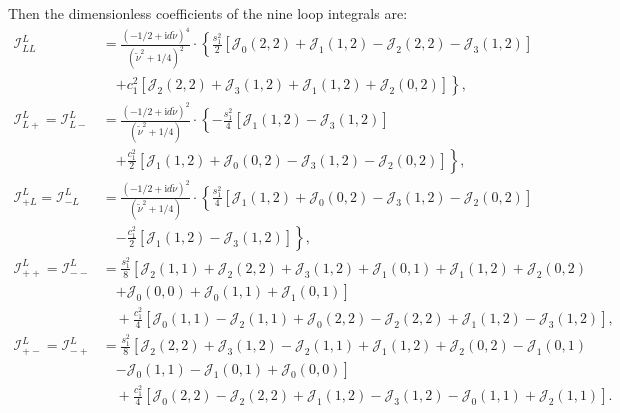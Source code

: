\documentclass[a4paper,12pt]{article}
\def\ii{\mathrm{i}}
\def\tn{\tilde\nu}
\begin{document}
Then the dimensionless coefficients of the nine loop integrals are:
\begin{align}
    \mathcal{I}_{LL}^{L}
    &= \frac{(-1/2+\ii d\tn)^4}{(\tn^2 + 1/4)^2} \cdot
    \left\{\frac{s_1^2}{2}\left[\mathcal{J}_0(2,2)+\mathcal{J}_1(1,2)
    -\mathcal{J}_2(2,2)-\mathcal{J}_3(1,2)\right] \right. \nonumber \\
    &\quad \left.
    +c_1^2\left[\mathcal{J}_2(2,2)+\mathcal{J}_3(1,2)+\mathcal{J}_1(1,2)+\mathcal{J}_2(0,2)\right]  \right\}, \\
    \mathcal{I}_{L+}^{L}
    =\mathcal{I}_{L-}^{L}
    &= \frac{(-1/2+\ii d\tn)^2}{(\tn^2 + 1/4)} \cdot \left\{ -\frac{s_1^2}{4}\left[\mathcal{J}_1(1,2)-\mathcal{J}_3(1,2)\right] \right. \nonumber \\
    &\quad \left.
    +\frac{c_1^2}{2}\left[\mathcal{J}_1(1,2)+\mathcal{J}_0(0,2)
    -\mathcal{J}_3(1,2)-\mathcal{J}_2(0,2)\right] \right\} , \\
    \mathcal{I}_{+L}^{L}
    =\mathcal{I}_{-L}^{L}
    &= \frac{(-1/2+\ii d\tn)^2}{(\tn^2 + 1/4)} \cdot \left\{ \frac{s_1^2}{4}\left[\mathcal{J}_1(1,2)+\mathcal{J}_0(0,2)
    -\mathcal{J}_3(1,2)-\mathcal{J}_2(0,2)\right] \right. \nonumber \\
    &\quad \left.
    -\frac{c_1^2}{2}\left[\mathcal{J}_1(1,2)-\mathcal{J}_3(1,2)\right] \right\},  \\
    \mathcal{I}_{++}^{L}
    =\mathcal{I}_{--}^{L}
    &= \frac{s_1^2}{8}\left[
    \mathcal{J}_2(1,1)+\mathcal{J}_2(2,2)+\mathcal{J}_3(1,2)
    +\mathcal{J}_1(0,1)+\mathcal{J}_1(1,2)+\mathcal{J}_2(0,2)\right. \nonumber \\
    &\quad\left.
    +\mathcal{J}_0(0,0)+\mathcal{J}_0(1,1)
    +\mathcal{J}_1(0,1)\right] \nonumber \\
    &\quad
    +\frac{c_1^2}{4}\left[\mathcal{J}_0(1,1)-\mathcal{J}_2(1,1)
    +\mathcal{J}_0(2,2)-\mathcal{J}_2(2,2)
    +\mathcal{J}_1(1,2)-\mathcal{J}_3(1,2)\right], \\
    \mathcal{I}_{+-}^{L}
    =\mathcal{I}_{-+}^{L}
    &= \frac{s_1^2}{8}\left[
    \mathcal{J}_2(2,2)+\mathcal{J}_3(1,2)-\mathcal{J}_2(1,1)
    +\mathcal{J}_1(1,2)+\mathcal{J}_2(0,2)-\mathcal{J}_1(0,1) \right. \nonumber \\
    &\quad\left.
    -\mathcal{J}_0(1,1)-\mathcal{J}_1(0,1)
    +\mathcal{J}_0(0,0) \right] \nonumber \\
    &\quad
    +\frac{c_1^2}{4}
    \left[\mathcal{J}_0(2,2)-\mathcal{J}_2(2,2)
    +\mathcal{J}_1(1,2)-\mathcal{J}_3(1,2)
    -\mathcal{J}_0(1,1)+\mathcal{J}_2(1,1)\right].
\end{align}
\end{document}
